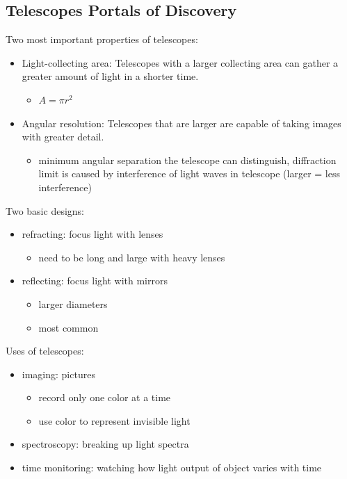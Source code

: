 \documentclass[12pt]{article}
\begin{document}
\subsection{Telescopes Portals of Discovery}
Two most important properties of telescopes:
\begin{itemize}
\item Light-collecting area: Telescopes with a larger collecting area can gather a greater amount of light in a shorter time.
\begin{itemize}
\item $A = \pi r^2$
\end{itemize}
\item Angular resolution: Telescopes that are larger are capable of taking images with greater detail.
\begin{itemize}
\item minimum angular separation the telescope can distinguish, diffraction limit is caused by interference of light waves in telescope (larger = less interference)
\end{itemize}
\end{itemize}
Two basic designs:
\begin{itemize}
\item refracting: focus light with lenses
\begin{itemize}
\item need to be long and large with heavy lenses
\end{itemize}
\item reflecting: focus light with mirrors
\begin{itemize}
\item larger diameters
\item most common
\end{itemize}
\end{itemize}
Uses of telescopes:
\begin{itemize}
\item imaging: pictures
\begin{itemize}
\item record only one color at a time
\item use color to represent invisible light
\end{itemize}
\item spectroscopy: breaking up light spectra
\item time monitoring: watching how light output of object varies with time
\end{itemize}
\end{document}
